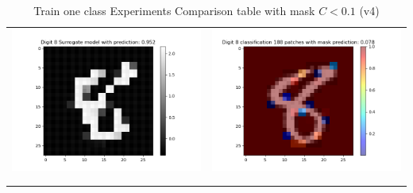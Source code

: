 \documentclass[12pt]{article}
\begin{document}
\newpage
\begin{table}[H]
    \centering
    \caption{Train one class Experiments Comparison table with mask $C < 0.1$ (v4)}
    \begin{tabular}{|c|c|}
        \hline
        \begin{minipage}{0.45\linewidth}
            \centering

            \includegraphics[width=\linewidth]{../fig/ID 1-Digit 8 pred 8 new_image.png}
        \end{minipage} &
        \begin{minipage}{0.45\linewidth}
            \centering

            \includegraphics[width=\linewidth]{../fig/ID 1-Digit 8 classification n patches = 188.png}
        \end{minipage} \\
        \\
        \hline
        \begin{minipage}{0.45\linewidth}
            \centering


\end{minipage}
\end{tabular}
\end{table}
\end{document}
